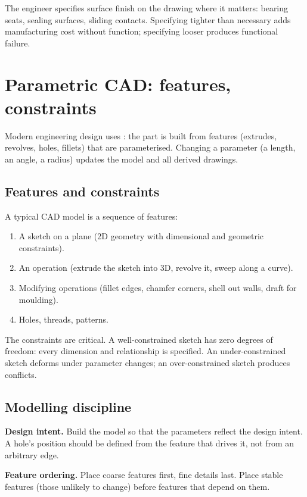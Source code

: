 The engineer specifies surface finish on the drawing where it matters: bearing seats, sealing surfaces, sliding contacts. Specifying tighter than necessary adds manufacturing cost without function; specifying looser produces functional failure.

\section{Parametric CAD: features, constraints}

Modern engineering design uses : the part is built from features (extrudes, revolves, holes, fillets) that are parameterised. Changing a parameter (a length, an angle, a radius) updates the model and all derived drawings.

\subsection{Features and constraints}

A typical CAD model is a sequence of features:
\begin{enumerate}[leftmargin=*]
  \item A sketch on a plane (2D geometry with dimensional and geometric constraints).
  \item An operation (extrude the sketch into 3D, revolve it, sweep along a curve).
  \item Modifying operations (fillet edges, chamfer corners, shell out walls, draft for moulding).
  \item Holes, threads, patterns.
\end{enumerate}

The constraints are critical. A well-constrained sketch has zero degrees of freedom: every dimension and relationship is specified. An under-constrained sketch deforms under parameter changes; an over-constrained sketch produces conflicts.

\subsection{Modelling discipline}

\textbf{Design intent.} Build the model so that the parameters reflect the design intent. A hole's position should be defined from the feature that drives it, not from an arbitrary edge.

\textbf{Feature ordering.} Place coarse features first, fine details last. Place stable features (those unlikely to change) before features that depend on them.

